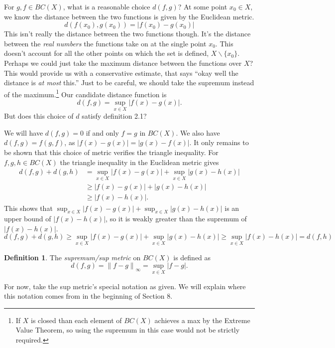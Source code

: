 \documentclass{article}
\newcommand{\norm}[1]{\left\lVert#1\right\rVert}
\theoremstyle{definition}
\newtheorem{definition}{Definition}[section]
\begin{document}
For $ g,f\in BC(X) $, what is a reasonable choice $ d(f,g) $? At some point $ x_0\in X $, we know the distance between the two functions is given by the Euclidean metric. $$d(f(x_0),g(x_0))=|f(x_0)-g(x_0)| $$ This isn't really the distance between the two functions though. It's the distance between the \textit{real numbers} the functions take on at the single point $ x_0 $. This doesn't account for all the other points on which the set is defined, $ X\backslash\{x_0\} $. Perhaps we could just take the maximum distance between the functions over $ X $? This would provide us with a conservative estimate, that says ``okay well the distance is \textit{at most} this.'' Just to be careful, we should take the supremum instead of the maximum.\footnote{If $ X $ is closed than each element of $ BC(X) $ achieves a max by the Extreme Value Theorem, so using the supremum in this case would not be strictly required.} Our candidate distance function is $$d(f,g)=\sup_{x\in X}|f(x)-g(x)| .$$
But does this choice of $ d $ satisfy definition 2.1?

We will have $ d(f,g)=0 $ if and only $ f=g $ in $ BC(X) $. We also have $ d(f,g)=f(g,f) $, as $ |f(x)-g(x)|=|g(x)-f(x)|  $. It only remains to be shown that this choice of metric verifies the triangle inequality. For $ f,g,h\in BC(X) $ the triangle inequality in the Euclidean metric gives  
\begin{align*}
	d(f,g)+d(g,h)&=\sup_{x\in X}|f(x)-g(x)|+\sup_{x\in X}|g(x)-h(x)|\\
				 &\ge |f(x)-g(x)|+|g(x)-h(x)|\\
				 &\ge |f(x)-h(x)|.
\end{align*}
This shows that $ \sup_{x\in X}|f(x)-g(x)|+\sup_{x\in X}|g(x)-h(x)| $ is an upper bound of $ |f(x)-h(x)| $, so it is weakly greater than the supremum of $ |f(x)-h(x)| $.
$$	d(f,g)+d(g,h)\ge \sup_{x\in X}|f(x)-g(x)|+\sup_{x\in X}|g(x)-h(x)|\ge \sup_{x\in X} |f(x)-h(x)|=d(f,h) $$
\begin{definition}
	The \textit{\color{red}supremum/sup metric} on $ BC(X) $ is defined as $$d(f,g)=\norm{f-g}_\infty=\sup_{x\in X}|f-g|. $$
\end{definition}
For now, take the sup metric's special notation as given. We will explain where this notation comes from in the beginning of Section 8. 
\end{document}

